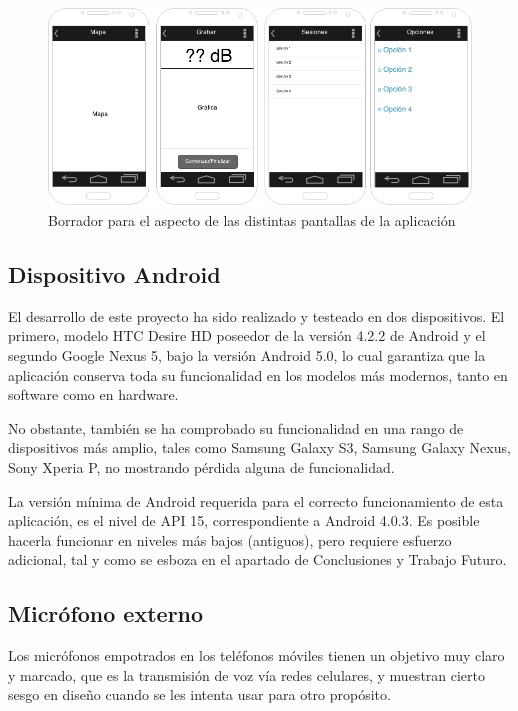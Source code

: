 \begin{figure}[h] \centering
    \includegraphics[width=15cm]{graphs/mockup.png} \caption{Borrador para el aspecto de las distintas pantallas de la aplicación}\label{fig:mockup}
\end{figure}
\subsection{Dispositivo Android}

El desarrollo de este proyecto ha sido realizado y testeado en dos dispositivos. El primero, modelo HTC Desire HD poseedor de la versión 4.2.2 de Android y el segundo Google Nexus 5, bajo la versión Android 5.0, lo cual garantiza que la aplicación conserva toda su funcionalidad en los modelos más modernos, tanto en software como en hardware. 

No obstante, también se ha comprobado su funcionalidad en una rango de dispositivos más amplio, tales como Samsung Galaxy S3, Samsung Galaxy Nexus, Sony Xperia P, no mostrando pérdida alguna de funcionalidad.

La versión mínima de Android requerida para el correcto funcionamiento de esta aplicación, es el nivel de \ac{API} 15, correspondiente a Android 4.0.3. Es posible hacerla funcionar en niveles más bajos (antiguos), pero requiere esfuerzo adicional, tal y como se esboza en el apartado de Conclusiones y Trabajo Futuro.

\subsection{Micrófono externo}

Los micrófonos empotrados en los teléfonos móviles tienen un objetivo muy claro y marcado, que es la transmisión de voz vía redes celulares, y muestran cierto sesgo en diseño cuando se les intenta usar para otro propósito.

